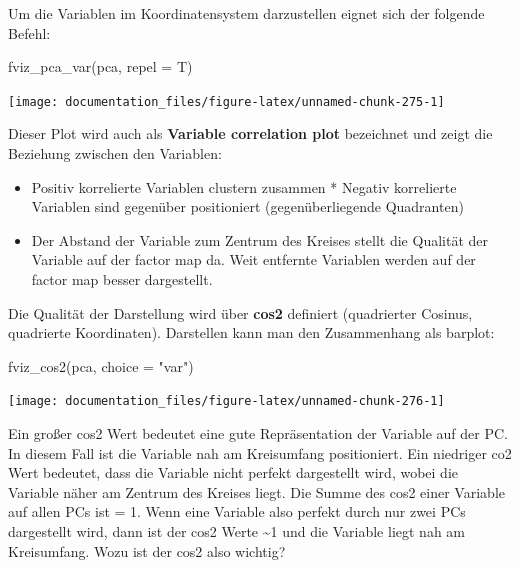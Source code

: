 \documentclass[
]{article}
\newenvironment{Shaded}{\begin{snugshade}}{\end{snugshade}}
\newcommand{\AttributeTok}[1]{\textcolor[rgb]{0.77,0.63,0.00}{#1}}
\newcommand{\FunctionTok}[1]{\textcolor[rgb]{0.00,0.00,0.00}{#1}}
\newcommand{\NormalTok}[1]{#1}
\newcommand{\StringTok}[1]{\textcolor[rgb]{0.31,0.60,0.02}{#1}}
\providecommand{\tightlist}{%
  \setlength{\itemsep}{0pt}\setlength{\parskip}{0pt}}
\begin{document}
Um die Variablen im Koordinatensystem darzustellen eignet sich der folgende Befehl:

\begin{Shaded}
\begin{Highlighting}[]

\FunctionTok{fviz\_pca\_var}\NormalTok{(pca, }\AttributeTok{repel =}\NormalTok{ T)}
\end{Highlighting}
\end{Shaded}

\begin{center}\texttt{[image: documentation\_files/figure-latex/unnamed-chunk-275-1]} \end{center}

Dieser Plot wird auch als \textbf{Variable correlation plot} bezeichnet und zeigt die Beziehung zwischen den Variablen:

\begin{itemize}
\tightlist
\item
  Positiv korrelierte Variablen clustern zusammen * Negativ korrelierte Variablen sind gegenüber positioniert (gegenüberliegende Quadranten)
\item
  Der Abstand der Variable zum Zentrum des Kreises stellt die Qualität der Variable auf der factor map da. Weit entfernte Variablen werden auf der factor map besser dargestellt.
\end{itemize}

Die Qualität der Darstellung wird über \textbf{cos2} definiert (quadrierter Cosinus, quadrierte Koordinaten). Darstellen kann man den Zusammenhang als barplot:

\begin{Shaded}
\begin{Highlighting}[]

\FunctionTok{fviz\_cos2}\NormalTok{(pca, }\AttributeTok{choice =} \StringTok{"var"}\NormalTok{)}
\end{Highlighting}
\end{Shaded}

\begin{center}\texttt{[image: documentation\_files/figure-latex/unnamed-chunk-276-1]} \end{center}

Ein großer cos2 Wert bedeutet eine gute Repräsentation der Variable auf der PC. In diesem Fall ist die Variable nah am Kreisumfang positioniert.
Ein niedriger co2 Wert bedeutet, dass die Variable nicht perfekt dargestellt wird, wobei die Variable näher am Zentrum des Kreises liegt. Die Summe des cos2 einer Variable auf allen PCs ist = 1.
Wenn eine Variable also perfekt durch nur zwei PCs dargestellt wird, dann ist der cos2 Werte \textasciitilde1 und die Variable liegt nah am Kreisumfang. Wozu ist der cos2 also wichtig?
\end{document}
